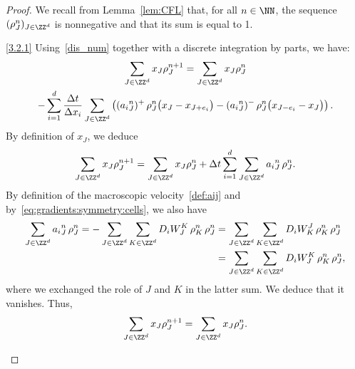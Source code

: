 \begin{proof}
We recall from Lemma~\ref{lem:CFL} that, for all $n\in \NN$, the sequence $(\rho_{J}^n)_{J \in \ZZ^d}$ is nonnegative and that its sum is equal to 1.

\begin{step}{\eqref{3.2.1}}
Using~\eqref{dis_num} together with a discrete integration by parts, we have:
\begin{multline*}
 \sum_{J\in \ZZ^d} x_J\rho_{J}^{n+1} = \sum_{J\in
\ZZ^d} x_J\rho_{J}^n \\
 - \sum_{i=1}^d\frac{\Delta t}{\Delta x_i} \sum_{J\in
\ZZ^d} \left(({a_i}^n_{J})^+ \, \rho_{J}^n \big(x_J-x_{J+e_i}\big) -({a_i}^n_{J})^- \, \rho_{J}^n \big(x_{J-e_i}-x_J\big) \right).
\end{multline*}
By definition of $x_J$, we deduce
\[
\sum_{J\in \ZZ^d} x_J\rho_{J}^{n+1} = \sum_{J\in \ZZ^d} x_J\rho_{J}^n + \Delta t \sum_{i=1}^d \sum_{J\in \ZZ^d} {a_i}^n_{J} \, \rho_{J}^n.
\]
By definition of the macroscopic velocity~\eqref{def:aij} and by~\eqref{eq:gradients:symmetry:cells}, we also have
\begin{equation*}
\begin{split}
\sum_{J\in \ZZ^d} {a_i}^n_{J} \, \rho_{J}^n = -\sum_{J\in \ZZ^d} \sum_{K\in \ZZ^d} D_iW_{J}^{K}\, \rho_{K}^n \, \rho_{J}^n &= \sum_{J\in \ZZ^d} \sum_{K\in \ZZ^d} D_iW^{J}_{K}\, \rho_{K}^n \, \rho_{J}^n
\\
&= \sum_{J\in \ZZ^d} \sum_{K\in \ZZ^d} D_iW^{K}_{J}\, \rho_{K}^n \, \rho_{J}^n,
\end{split}
\end{equation*}
where we exchanged the role of $J$ and $K$ in the latter sum. We deduce that it vanishes. Thus,
\[
\sum_{J\in \ZZ^d} x_J\rho_{J}^{n+1} = \sum_{J\in \ZZ^d} x_J\rho_{J}^n.
\]
\end{step}


\end{proof}
